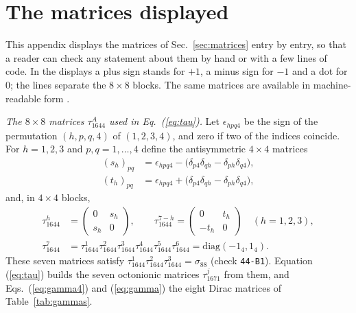 
\appendix

\section{The matrices displayed}
\label{app:matrices}

This appendix displays the matrices of Sec.~\ref{sec:matrices} entry by entry, so that a reader can
check any statement about them by hand or with a few lines of code. In the displays a plus sign
stands for $+1$, a minus sign for $-1$ and a dot for $0$; the lines separate the $8\times8$ blocks.
The same matrices are available in machine-readable form \cite{SpacetimesRepo}.

\emph{The $8\times8$ matrices $\tau_{1644}^A$ used in Eq.~(\ref{eq:tau}).} Let $\epsilon_{hpq4}$ be
the sign of the permutation $(h,p,q,4)$ of $(1,2,3,4)$, and zero if two of the indices coincide. For
$h=1,2,3$ and $p,q=1,\dots,4$ define the antisymmetric $4\times4$ matrices
\begin{align}
(s_h)_{pq}&=\epsilon_{hpq4}-\big(\delta_{p4}\delta_{qh}-\delta_{ph}\delta_{q4}\big),\nonumber\\
(t_h)_{pq}&=\epsilon_{hpq4}+\big(\delta_{p4}\delta_{qh}-\delta_{ph}\delta_{q4}\big),
\label{eq:st}
\end{align}
and, in $4\times4$ blocks,
\begin{align}
\tau_{1644}^h&=\begin{pmatrix}0&s_h\\ s_h&0\end{pmatrix},\qquad
\tau_{1644}^{7-h}=\begin{pmatrix}0&t_h\\ -t_h&0\end{pmatrix}\quad(h=1,2,3),\nonumber\\
\tau_{1644}^7&=\tau_{1644}^1\tau_{1644}^2\tau_{1644}^3\tau_{1644}^4\tau_{1644}^5\tau_{1644}^6=\mathrm{diag}(-1_4,1_4).
\label{eq:tau44}
\end{align}
These seven matrices satisfy $\tau_{1644}^1\tau_{1644}^2\tau_{1644}^3=\sigma_{88}$ (check
\texttt{44-B1}). Equation (\ref{eq:tau}) builds the seven octonionic matrices $\tau_{1671}^j$ from
them, and Eqs.~(\ref{eq:gamma4}) and (\ref{eq:gamma}) the eight Dirac matrices of
Table~\ref{tab:gammas}.

